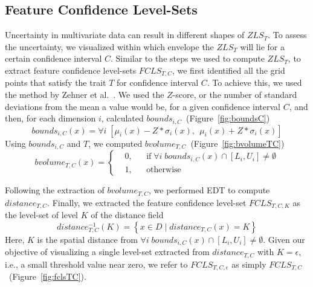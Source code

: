 



\vspace{-1mm}
\subsection{Feature Confidence Level-Sets}
\label{sec:fcls}
%
Uncertainty in multivariate data can result in different shapes of $ZLS_{T}$.
%
To assess the uncertainty, we visualized within which envelope the $ZLS_{T}$ will lie for a certain confidence interval $C$.
%
Similar to the steps we used to compute $ZLS_{T}$, to extract feature confidence level-sets $FCLS_{T,C}$, we first identified all the grid points that satisfy the trait $T$ for confidence interval $C$.
%
To achieve this, we used the method by Zehner et al.~\cite{zehner2010visualization}. 
%
We used the $Z$-score, or the number of standard deviations from the mean a value would be, for a given confidence interval $C$, and then, for each dimension $i$, calculated $bounds_{i,C}$~(Figure~\ref{fig:boundsC})
\begin{equation}
bounds_{i,C}(x) = \forall i \; [{\mu}_{i}(x) - Z*{\sigma}_{i}(x),~~{\mu}_{i}(x) + Z*{\sigma}_{i}(x)]
\end{equation}
%
Using $bounds_{i,C}$ and $T$, we computed $bvolume_{T,C}$~(Figure~\ref{fig:bvolumeTC})
\begin{equation}
  bvolume_{T,C}(x) = \left \{
  \begin{aligned}
    &0, && \text{if}\; \forall i\; bounds_{i, C}(x) \cap [L_{i}, U_{i}] \neq \emptyset \\
    &1, && \text{otherwise}
  \end{aligned} \right.
\end{equation}
%

Following the extraction of $bvolume_{T,C}$, we performed EDT to compute $distance_{T,C}$.
%
Finally, we extracted the feature confidence level-set $FCLS_{T,C,K}$ as the level-set of level $K$ of the distance field
%
\begin{equation} 
distance_{T,C}^{-1}(K) = \left\{ x \in D\; |\; distance_{T,C}(x) = K\right\}
\end{equation}
Here, $K$ is the spatial distance from $\forall i\; bounds_{i,C}(x) \cap [L_{i}, U_{i}] \neq \emptyset$.
%
Given our objective of visualizing a single level-set extracted from $distance_{T,C}$ with $K = \epsilon$, i.e., a small threshold value near zero, we refer to $FCLS_{T,C,\epsilon}$ as simply $FCLS_{T,C}$~(Figure~\ref{fig:fclsTC}).
%
